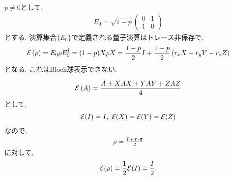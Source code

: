 \begin{ex}
    \label{ex8.16}
    $p\neq 0$として,
    \begin{align*}
        E_0 =
        \sqrt{1-p}
        \begin{pmatrix}
            0 & 1 \\
            1 & 0
        \end{pmatrix}
    \end{align*}
    とする. 演算集合$\{ E_0 \}$で定義される量子演算はトレース非保存で,
    \begin{align*}
        \mathcal{E} \left( \rho\right)
        =
        E_0 \rho E_0^\dagger
        =
        (1-p)X \rho X
        =
        \frac{1-p}{2} I
        +
        \frac{1-p}{2}
        \left( r_x X - r_y Y - r_z Z\right)
    \end{align*}
    となる. これはBloch球表示できない.
\end{ex}

\begin{ex}
    \label{ex8.17}
    \begin{align*}
        \mathcal{E} \left( A \right)
        =
        \frac{A + XAX + YAY + ZAZ}{4}
    \end{align*}
    として,
    \begin{align*}
        \mathcal{E}(I) = I,\ \mathcal{E}(X) = \mathcal{E}(Y) = \mathcal{E}(Z)
    \end{align*}
    なので,
    \begin{align*}
        \rho = \frac{I + \bm{r} \cdot \bm{\sigma}}{2}
    \end{align*}
    に対して,
    \begin{align*}
        \mathcal{E} ( \rho) = \frac{1}{2}\mathcal{E} ( I ) = \frac{I}{2}.
    \end{align*}
\end{ex}

